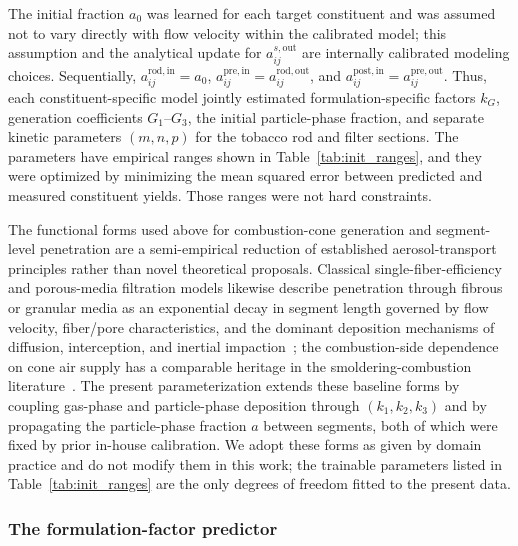 ﻿\documentclass[a4paper,fleqn]{cas-sc}
\begin{document}
The initial fraction $a_0$ was learned for each target constituent and was assumed not to vary directly with flow velocity within the calibrated model; this assumption and the analytical update for $a_{ij}^{s,\mathrm{out}}$ are internally calibrated modeling choices. Sequentially, $a_{ij}^{\mathrm{rod},\mathrm{in}}=a_0$, $a_{ij}^{\mathrm{pre},\mathrm{in}}=a_{ij}^{\mathrm{rod},\mathrm{out}}$, and $a_{ij}^{\mathrm{post},\mathrm{in}}=a_{ij}^{\mathrm{pre},\mathrm{out}}$. Thus, each constituent-specific model jointly estimated formulation-specific factors $k_G$, generation coefficients $G_1$--$G_3$, the initial particle-phase fraction, and separate kinetic parameters $(m,n,p)$ for the tobacco rod and filter sections. The parameters have empirical ranges shown in Table~\ref{tab:init_ranges}, and they were optimized by minimizing the mean squared error between predicted and measured constituent yields. Those ranges were not hard constraints.



The functional forms used above for combustion-cone generation and
segment-level penetration are a semi-empirical reduction of established
aerosol-transport principles rather than novel theoretical proposals.
Classical single-fiber-efficiency and porous-media filtration models
likewise describe penetration through fibrous or granular media as an
exponential decay in segment length governed by flow velocity,
fiber/pore characteristics, and the dominant deposition mechanisms of
diffusion, interception, and inertial
impaction~\cite{liu2020particulate,xu2020airfiltering}; the
combustion-side dependence on cone air supply has a comparable
heritage in the smoldering-combustion
literature~\cite{torero2020smouldering}. The present parameterization
extends these baseline forms by coupling gas-phase and particle-phase
deposition through $(k_1, k_2, k_3)$ and by propagating the
particle-phase fraction $a$ between segments, both of which were
fixed by prior in-house calibration. We adopt these forms as given by
domain practice and do not modify them in this work; the trainable
parameters listed in Table~\ref{tab:init_ranges} are the only
degrees of freedom fitted to the present data.

\subsubsection{The formulation-factor predictor}
\end{document}
